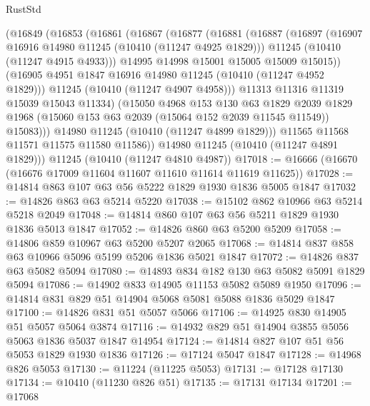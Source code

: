 \begin{lexlean}{RustStd}
\begin{coremodule}
          (@16849
            (@16853
              (@16861
                (@16867
                  (@16877
                    (@16881
                      (@16887
                        (@16897
                          (@16907 @16916 @14980 @11245 (@10410 (@11247 @4925 @1829)))
                          @11245
                          (@10410 (@11247 @4915 @4933)))
                        @14995
                        @14998
                        @15001
                        @15005
                        @15009
                        @15015))
                    (@16905 @4951 @1847 @16916 @14980 @11245 (@10410 (@11247 @4952 @1829)))
                    @11245
                    (@10410 (@11247 @4907 @4958)))
                  @11313
                  @11316
                  @11319
                  @15039
                  @15043
                  @11334)
                (@15050
                  @4968
                  @153
                  @130
                  @63
                  @1829
                  @2039
                  @1829
                  @1968
                  (@15060 @153 @63 @2039 (@15064 @152 @2039 @11545 @11549))
                  @15083)))
            @14980
            @11245
            (@10410 (@11247 @4899 @1829)))
          @11565
          @11568
          @11571
          @11575
          @11580
          @11586))
      @14980
      @11245
      (@10410 (@11247 @4891 @1829)))
    @11245
    (@10410 (@11247 @4810 @4987))
@17018 := @16666 (@16670 (@16676 @17009 @11604 @11607 @11610 @11614 @11619 @11625))
@17028 := @14814 @863 @107 @63 @56 @5222 @1829 @1930 @1836 @5005 @1847
@17032 := @14826 @863 @63 @5214 @5220
@17038 := @15102 @862 @10966 @63 @5214 @5218 @2049
@17048 := @14814 @860 @107 @63 @56 @5211 @1829 @1930 @1836 @5013 @1847
@17052 := @14826 @860 @63 @5200 @5209
@17058 := @14806 @859 @10967 @63 @5200 @5207 @2065
@17068 := @14814 @837 @858 @63 @10966 @5096 @5199 @5206 @1836 @5021 @1847
@17072 := @14826 @837 @63 @5082 @5094
@17080 := @14893 @834 @182 @130 @63 @5082 @5091 @1829 @5094
@17086 := @14902 @833 @14905 @11153 @5082 @5089 @1950
@17096 := @14814 @831 @829 @51 @14904 @5068 @5081 @5088 @1836 @5029 @1847
@17100 := @14826 @831 @51 @5057 @5066
@17106 := @14925 @830 @14905 @51 @5057 @5064 @3874
@17116 := @14932 @829 @51 @14904 @3855 @5056 @5063 @1836 @5037 @1847 @14954
@17124 := @14814 @827 @107 @51 @56 @5053 @1829 @1930 @1836
@17126 := @17124 @5047 @1847
@17128 := @14968 @826 @5053
@17130 := @11224 (@11225 @5053)
@17131 := @17128 @17130
@17134 := @10410 (@11230 @826 @51)
@17135 := @17131 @17134
@17201 := @17068

\end{coremodule}
\end{lexlean}
